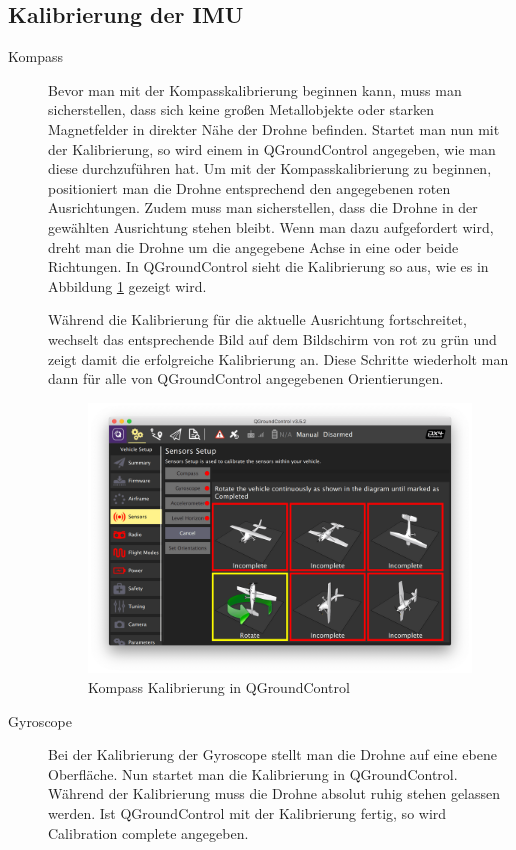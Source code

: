 \subsection{Kalibrierung der IMU}
\begin{description}
    \item[Kompass] Bevor man mit der Kompasskalibrierung beginnen kann, muss man sicherstellen, dass sich keine großen Metallobjekte oder starken Magnetfelder in direkter Nähe der Drohne befinden. Startet man nun mit der Kalibrierung, so wird einem in QGroundControl angegeben, wie man diese durchzuführen hat. Um mit der Kompasskalibrierung zu beginnen, positioniert man die Drohne entsprechend den angegebenen roten Ausrichtungen. Zudem muss man sicherstellen, dass die Drohne in der gewählten Ausrichtung stehen bleibt. Wenn man dazu aufgefordert wird, dreht man die Drohne um die angegebene Achse in eine oder beide Richtungen. In QGroundControl sieht die Kalibrierung so aus, wie es in Abbildung \ref{fig:compass-calibration} gezeigt wird.

    Während die Kalibrierung für die aktuelle Ausrichtung fortschreitet, wechselt das entsprechende Bild auf dem Bildschirm von rot zu grün und zeigt damit die erfolgreiche Kalibrierung an. Diese Schritte wiederholt man dann für alle von QGroundControl angegebenen Orientierungen.
    \begin{figure}[H]
        \includegraphics[width=\textwidth]{./images/qgc-cal-compass.png}
        \caption{Kompass Kalibrierung in QGroundControl}\label{fig:compass-calibration}
    \end{figure}
    
    \item[Gyroscope] Bei der Kalibrierung der Gyroscope stellt man die Drohne auf eine ebene Oberfläche. Nun startet man die Kalibrierung in QGroundControl. Während der Kalibrierung muss die Drohne absolut ruhig stehen gelassen werden. Ist QGroundControl mit der Kalibrierung fertig, so wird Calibration complete angegeben.
    

\end{description}
